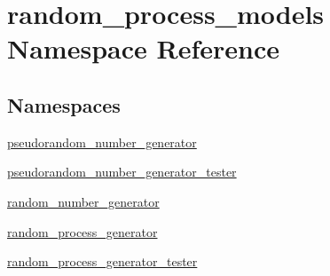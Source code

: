 \hypertarget{namespacerandom__process__models}{}\section{random\+\_\+process\+\_\+models Namespace Reference}
\label{namespacerandom__process__models}
\subsection*{Namespaces}
\begin{DoxyCompactItemize}
\item 
 \hyperlink{namespacerandom__process__models_1_1pseudorandom__number__generator}{pseudorandom\+\_\+number\+\_\+generator}
\item 
 \hyperlink{namespacerandom__process__models_1_1pseudorandom__number__generator__tester}{pseudorandom\+\_\+number\+\_\+generator\+\_\+tester}
\item 
 \hyperlink{namespacerandom__process__models_1_1random__number__generator}{random\+\_\+number\+\_\+generator}
\item 
 \hyperlink{namespacerandom__process__models_1_1random__process__generator}{random\+\_\+process\+\_\+generator}
\item 
 \hyperlink{namespacerandom__process__models_1_1random__process__generator__tester}{random\+\_\+process\+\_\+generator\+\_\+tester}
\end{DoxyCompactItemize}
